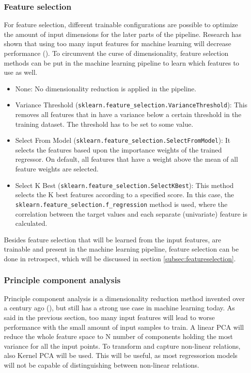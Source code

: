 \subsubsection{Feature selection}
For feature selection, different trainable configurations are possible to optimize the amount of input dimensions for the later parts of the pipeline. Research has shown that using too many input features for machine learning will decrease performance (\cite{Trunk1979-sq}). To circumvent the curse of dimensionality, feature selection methods can be put in the machine learning pipeline to learn which features to use as well. 

\begin{itemize}
	\item None: No dimensionality reduction is applied in the pipeline.
	\item Variance Threshold (\verb|sklearn.feature_selection.VarianceThreshold|): This removes all features that in have a variance below a certain threshold in the training dataset. The threshold has to be set to some value.
	\item Select From Model (\verb|sklearn.feature_selection.SelectFromModel|): It selects the features based upon the importance weights of the trained regressor. On default, all features that have a weight above the mean of all feature weights are selected.
	\item Select K Best (\verb|sklearn.feature_selection.SelectKBest|): This method selects the K best features according to a specified score. In this case, the \\\verb|sklearn.feature_selection.f_regression| method is used, where the correlation between the target values and each separate (univariate) feature is calculated.
\end{itemize}

Besides feature selection that will be learned from the input features, are trainable and present in the machine learning pipeline, feature selection can be done in retrospect, which will be discussed in section \ref{subsec:featureselection}.

\subsubsection{Principle component analysis}
Principle component analysis is a dimensionality reduction method invented over a century ago (\cite{Pearson1901-de}), but still has a strong use case in machine learning today. As said in the previous section, too many input features will lead to worse performance with the small amount of input samples to train. A linear PCA will reduce the whole feature space to N number of components holding the most variance for all the input points. To transform and capture non-linear relations, also Kernel PCA will be used. This will be useful, as most regressorion models will not be capable of distinguishing between non-linear relations.

